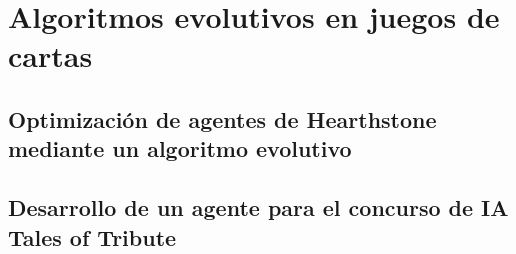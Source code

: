 



\section{Algoritmos evolutivos en juegos de cartas} \label{sec:trabajos_relacionados}




\subsection{Optimización de agentes de Hearthstone mediante un algoritmo evolutivo}

\subsection{Desarrollo de un agente para el concurso de IA Tales of Tribute}

